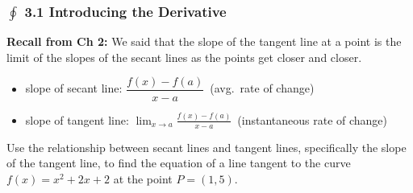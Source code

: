 \documentclass[14pt]{beamer}
\begin{document}
\begin{frame}
\frametitle{$\oint$ 3.1 Introducing the Derivative}
\small
{\bf Recall from Ch 2:}  We said that the slope of the tangent line at a point is the limit of the slopes of the secant lines as the points get closer and closer.

\vspace{0.5pc}

\begin{itemize}
\item slope of secant line:  $\dfrac{f(x)-f(a)}{x-a}$\ (avg.\ rate of change) 

\vspace{0.5pc}
\item slope of tangent line:  $\displaystyle\lim_{x \to a} \frac{f(x)-f(a)}{x-a}$\ (instantaneous rate of change)
\end{itemize}
\end{frame}


\begin{frame}

Use the relationship between secant lines and tangent lines, specifically the slope of the tangent line, to find the equation of a line tangent to the curve $f(x)=x^2+2x+2$ at the point $P=(1,5)$.

\end{frame}
\end{document}
